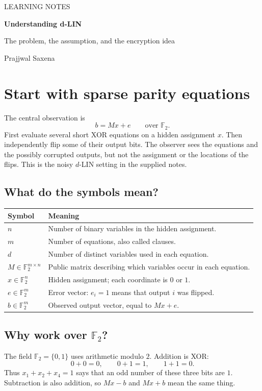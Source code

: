 \documentclass[11pt,a4paper]{article}
\newcommand{\F}{\mathbb{F}}
\begin{document}
\thispagestyle{firstpage}
{\color{accent}\sffamily\small LEARNING NOTES}\par
\vspace{3pt}
{\color{ink}\fontsize{28}{32}\selectfont\bfseries Understanding d-LIN}\par
{\large The problem, the assumption, and the encryption idea}\par
\vspace{4pt}
{\small Prajjwal Saxena}\par
\vspace{9pt}

\section{Start with sparse parity equations}
The central observation is
\[
\boxed{b=Mx+e\qquad\text{over }\F_2.}
\]
First evaluate several short XOR equations on a hidden assignment $x$. Then independently flip some of their output bits. The observer sees the equations and the possibly corrupted outputs, but not the assignment or the locations of the flips. This is the noisy $d$-LIN setting in the supplied notes.~\cite{draft1,draft2}

\subsection*{What do the symbols mean?}
\begin{tabularx}{\textwidth}{@{}p{2.1cm}Y@{}}
\toprule
Symbol & Meaning \\
\midrule
$n$ & Number of binary variables in the hidden assignment.\\
$m$ & Number of equations, also called clauses.\\
$d$ & Number of distinct variables used in each equation.\\
$M\in\F_2^{m\times n}$ & Public matrix describing which variables occur in each equation.\\
$x\in\F_2^n$ & Hidden assignment; each coordinate is $0$ or $1$.\\
$e\in\F_2^m$ & Error vector: $e_i=1$ means that output $i$ was flipped.\\
$b\in\F_2^m$ & Observed output vector, equal to $Mx+e$.\\
\bottomrule
\end{tabularx}

\subsection*{Why work over $\F_2$?}
The field $\F_2=\{0,1\}$ uses arithmetic modulo $2$. Addition is XOR:
\[
0+0=0,\qquad 0+1=1,\qquad 1+1=0.
\]
Thus $x_1+x_2+x_4=1$ says that an odd number of these three bits are $1$. Subtraction is also addition, so $Mx-b$ and $Mx+b$ mean the same thing.
\end{document}
